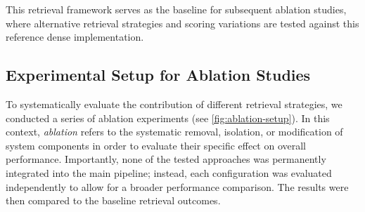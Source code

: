 \begin{spacing}{1.5}
This retrieval framework serves as the baseline for subsequent ablation studies, where alternative retrieval strategies and scoring variations are tested against this reference dense implementation.

\subsection{Experimental Setup for Ablation Studies}\label{sec:exp_ablation}
To systematically evaluate the contribution of different retrieval strategies, we conducted a series of ablation experiments (see \autoref{fig:ablation-setup}). In this context, \textit{ablation} refers to the systematic removal, isolation, or modification of system components in order to evaluate their specific effect on overall performance. Importantly, none of the tested approaches was permanently integrated into the main pipeline; instead, each configuration was evaluated independently to allow for a broader performance comparison. The results were then compared to the baseline retrieval outcomes.\\


\end{spacing}
